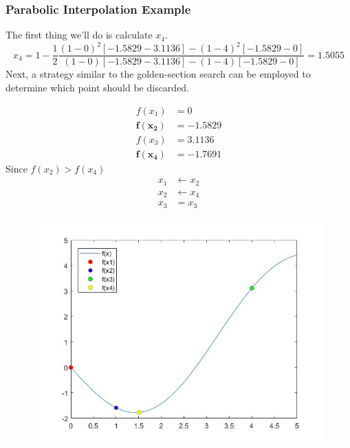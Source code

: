 \documentclass{if-beamer}
\begin{document}
\begin{frame}[t]
	\frametitle{Parabolic Interpolation Example}
	The first thing we'll do is calculate $x_4$.
	$$ x_4 = 1-\frac{1}{2}\frac{(1-0)^2[-1.5829-3.1136]-(1-4)^2[-1.5829-0]}{(1-0)[-1.5829-3.1136]-(1-4)[-1.5829-0]}=1.5055$$	
	Next, a strategy similar to the golden-section search can be employed to determine
	which point should be discarded.\\
	\begin{minipage}{0.5\textwidth}
		\begin{align*}
			f(x_1) &= 0\\
			\mathbf{f(x_2)} &= \mathbf{-1.5829}\\
			f(x_3) &= 3.1136\\
			\mathbf{f(x_4)} &= \mathbf{-1.7691}
		\end{align*}
	Since $f(x_2)>f(x_4)$
	\begin{align*}
		x_1 &\leftarrow x_2\\
		x_2 &\leftarrow x_4\\
		x_3 &= x_3\\
	\end{align*}
	\end{minipage}
	\begin{minipage}{0.5\textwidth}
		\begin{figure}
			\centering
			\includegraphics[width=\textwidth]{figures/plot2}
		\end{figure}
	\end{minipage}
\end{frame}
\end{document}
